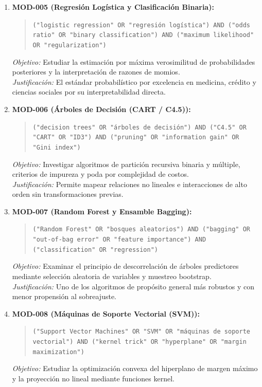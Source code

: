 \begin{enumerate}
  \textit{Justificación:} Es la línea base paramétrica obligatoria de comparación para cualquier problema predictivo continuo.
  \item \textbf{MOD-005 (Regresión Logística y Clasificación Binaria):}
  \begin{quote}
  \texttt{("logistic regression" OR "regresión logística") AND ("odds ratio" OR "binary classification") AND ("maximum likelihood" OR "regularization")}
  \end{quote}
  \textit{Objetivo:} Estudiar la estimación por máxima verosimilitud de probabilidades posteriores y la interpretación de razones de momios.\\
  \textit{Justificación:} El estándar probabilístico por excelencia en medicina, crédito y ciencias sociales por su interpretabilidad directa.
  \item \textbf{MOD-006 (Árboles de Decisión (CART / C4.5)):}
  \begin{quote}
  \texttt{("decision trees" OR "árboles de decisión") AND ("C4.5" OR "CART" OR "ID3") AND ("pruning" OR "information gain" OR "Gini index")}
  \end{quote}
  \textit{Objetivo:} Investigar algoritmos de partición recursiva binaria y múltiple, criterios de impureza y poda por complejidad de costos.\\
  \textit{Justificación:} Permite mapear relaciones no lineales e interacciones de alto orden sin transformaciones previas.
  \item \textbf{MOD-007 (Random Forest y Ensamble Bagging):}
  \begin{quote}
  \texttt{("Random Forest" OR "bosques aleatorios") AND ("bagging" OR "out-of-bag error" OR "feature importance") AND ("classification" OR "regression")}
  \end{quote}
  \textit{Objetivo:} Examinar el principio de descorrelación de árboles predictores mediante selección aleatoria de variables y muestreo bootstrap.\\
  \textit{Justificación:} Uno de los algoritmos de propósito general más robustos y con menor propensión al sobreajuste.
  \item \textbf{MOD-008 (Máquinas de Soporte Vectorial (SVM)):}
  \begin{quote}
  \texttt{("Support Vector Machines" OR "SVM" OR "máquinas de soporte vectorial") AND ("kernel trick" OR "hyperplane" OR "margin maximization")}
  \end{quote}
  \textit{Objetivo:} Estudiar la optimización convexa del hiperplano de margen máximo y la proyección no lineal mediante funciones kernel.\\

\end{enumerate}
